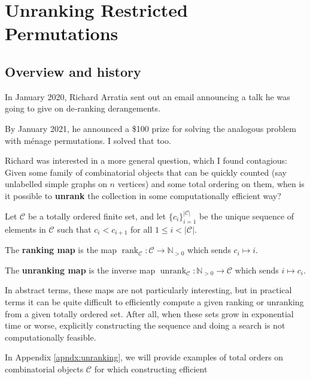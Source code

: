 \chapter{Unranking Restricted Permutations}
\label{cha:UnrankingMenage}

\section{Overview and history}

In January 2020, Richard Arratia sent out an email announcing a talk he was
going to give on de-ranking derangements.

By January 2021, he announced a \$100 prize for solving the analogous problem
with m\'enage permutations. I solved that too.

Richard was interested in a more general question, which I found contagious:
Given some family of combinatorial objects that can be quickly counted
(say unlabelled simple graphs on $n$ vertices)
and some total ordering on them,
when is it possible to \textbf{unrank} the collection in some computationally
efficient way?

\begin{definition}
  Let $\mathcal C$ be a totally ordered finite set, and
  let $\{c_i\}_{i=1}^{|\mathcal C|}$ be the unique sequence of elements in
  $\mathcal{C}$ such that $c_i < c_{i+1}$ for all $1 \leq i < |\mathcal{C}|$.

  The \textbf{ranking map} is the map
  $\operatorname{rank}_{\mathcal{C}} \colon \mathcal{C} \rightarrow \mathbb N_{>0}$
  which sends $c_i \mapsto i$.

  The \textbf{unranking map} is the inverse map
  $\operatorname{unrank}_{\mathcal{C}} \colon \mathbb N_{>0} \rightarrow \mathcal{C}$
  which sends $i \mapsto c_i$.
\end{definition}

In abstract terms, these maps are not particularly interesting, but in practical
terms it can be quite difficult to efficiently compute a given ranking or
unranking from a given totally ordered set. After all, when these sets
grow in exponential time or worse, explicitly constructing the sequence and
doing a search is not computationally feasible.

In Appendix \ref{apndx:unranking}, we will provide examples of total orders on combinatorial
objects $\mathcal{C}$ for which constructing efficient

